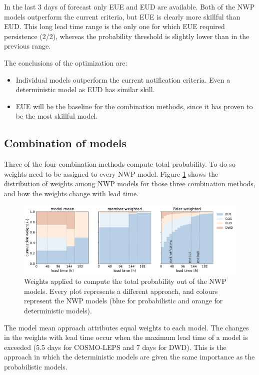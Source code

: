 \documentclass[preprint,12pt]{elsarticle}
\begin{document}
In the last 3 days of forecast only EUE and EUD are available. Both of the NWP models outperform the current criteria, but EUE is clearly more skillful than EUD. This long lead time range is the only one for which EUE required persistence (2/2), whereas the probability threshold is slightly lower than in the previous range.

The conclusions of the optimization are:

\begin{itemize}
    \item Individual models outperform the current notification criteria. Even a deterministic model as EUD has similar skill.
    \item EUE will be the baseline for the combination methods, since it has proven to be the most skillful model.
\end{itemize}

\subsection{Combination of models}
\label{ref:results_COMB}

Three of the four combination methods compute total probability. To do so weights need to be assigned to every NWP model. Figure \ref{fig:weights} shows the distribution of weights among NWP models for those three combination methods, and how the weights change with lead time.

\begin{figure}
    \centering
    \includegraphics[width=1\textwidth]{figures/weights.pdf}
    \caption{Weights applied to compute the total probability out of the NWP models. Every plot represents a different approach, and colours represent the NWP models (blue for probabilistic and orange for deterministic models).}
    \label{fig:weights}
\end{figure}

The model mean approach attributes equal weights to each model. The changes in the weights with lead time occur when the maximum lead time of a model is exceeded (5.5 days for COSMO-LEPS and 7 days for DWD). This is the approach in which the deterministic models are given the same importance as the probabilistic models.
\end{document}
